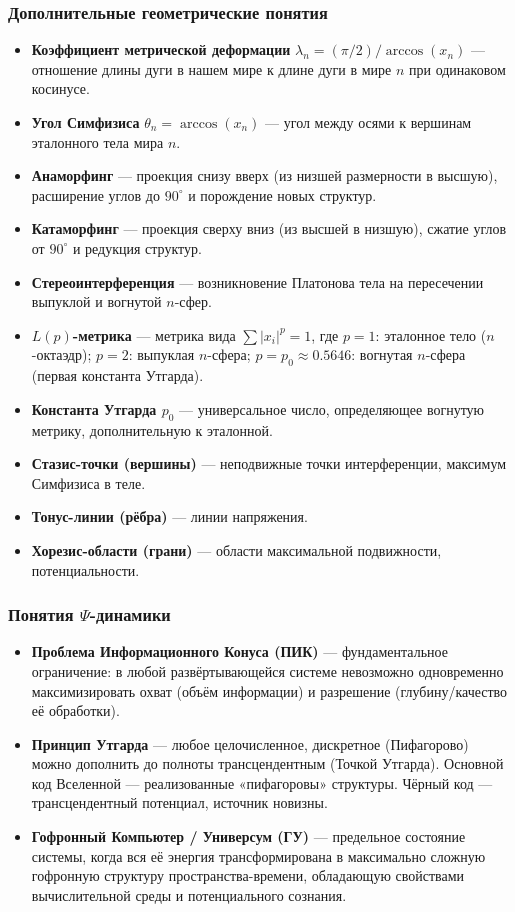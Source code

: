 \documentclass[a4paper,12pt]{article}
\begin{document}
\subsubsection{Дополнительные геометрические понятия}

\begin{itemize}
	\item \textbf{Коэффициент метрической деформации} $\lambda_n = (\pi/2) / \arccos(x_n)$ — отношение длины дуги в нашем мире к длине дуги в мире $n$ при одинаковом косинусе.
	\item \textbf{Угол Симфизиса} $\theta_n = \arccos(x_n)$ — угол между осями к вершинам эталонного тела мира $n$.
	\item \textbf{Анаморфинг} — проекция снизу вверх (из низшей размерности в высшую), расширение углов до $90^\circ$ и порождение новых структур.
	\item \textbf{Катаморфинг} — проекция сверху вниз (из высшей в низшую), сжатие углов от $90^\circ$ и редукция структур.
	\item \textbf{Стереоинтерференция} — возникновение Платонова тела на пересечении выпуклой и вогнутой $n$-сфер.
	\item \textbf{$L(p)$-метрика} — метрика вида $\sum |x_i|^p = 1$, где $p=1$: эталонное тело ($n$-октаэдр); $p=2$: выпуклая $n$-сфера; $p=p_0 \approx 0.5646$: вогнутая $n$-сфера (первая константа Утгарда).
	\item \textbf{Константа Утгарда $p_0$} — универсальное число, определяющее вогнутую метрику, дополнительную к эталонной.
	\item \textbf{Стазис-точки (вершины)} — неподвижные точки интерференции, максимум Симфизиса в теле.
	\item \textbf{Тонус-линии (рёбра)} — линии напряжения.
	\item \textbf{Хорезис-области (грани)} — области максимальной подвижности, потенциальности.
\end{itemize}

\subsubsection{Понятия $\Psi$-динамики}

\begin{itemize}
	\item \textbf{Проблема Информационного Конуса (ПИК)} — фундаментальное ограничение: в любой развёртывающейся системе невозможно одновременно максимизировать охват (объём информации) и разрешение (глубину/качество её обработки).
	\item \textbf{Принцип Утгарда} — любое целочисленное, дискретное (Пифагорово) можно дополнить до полноты трансцендентным (Точкой Утгарда). Основной код Вселенной — реализованные «пифагоровы» структуры. Чёрный код — трансцендентный потенциал, источник новизны.
	\item \textbf{Гофронный Компьютер / Универсум (ГУ)} — предельное состояние системы, когда вся её энергия трансформирована в максимально сложную гофронную структуру пространства-времени, обладающую свойствами вычислительной среды и потенциального сознания.
\end{itemize}
\end{document}
